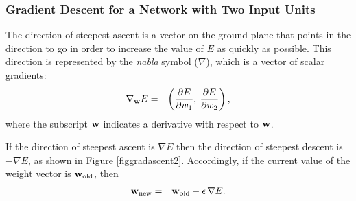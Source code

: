 \documentclass{beamer}
\newcommand{\bw}{       {\bf w      } }
\newcommand{\bea}       { \begin{eqnarray}  }
\newcommand{\eea}       { \end{eqnarray}    }
\newcommand{\nn}	{\nonumber}
\begin{document}
\begin{frame}
  \frametitle{Gradient Descent for a Network with Two Input Units}
 The  direction of steepest ascent is a vector on the ground plane that points in the direction to go in order to increase the value of $E$ as quickly as possible. 
This direction is represented by %
 the {\em nabla\/} symbol  ($\nabla$), 
which is a vector of scalar gradients: 
\bea
			 	\nabla_{\bw} E & = &  	\left( \frac{\d E}{\d w_{1}} , \:\frac{\d E}{\d w_{2}} \right), \label{eqgradE}
\eea
where the subscript $\bw$ indicates a derivative with respect to $\bw$. %

If the direction of steepest ascent is $\nabla E$ then the direction of steepest descent is $-\nabla E$,
 as shown in Figure \ref{figgradascent2}. Accordingly, if the current value of the weight vector is $\bw_{\rm old}$, then
\bea
	\bw_{\rm new} & = & \bw_{\rm old}    -\epsilon \, \nabla E.  \label{eqdeltasimple}
\eea 

\end{frame}
\end{document}
